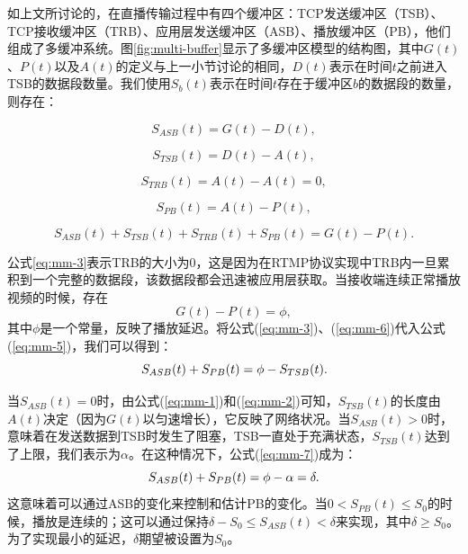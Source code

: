如上文所讨论的，在直播传输过程中有四个缓冲区：TCP发送缓冲区（TSB）、TCP接收缓冲区（TRB）、应用层发送缓冲区（ASB）、播放缓冲区（PB），他们组成了多缓冲系统。图\ref{fig:multi-buffer}显示了多缓冲区模型的结构图，其中$G(t)$、$P(t)$以及$A(t)$的定义与上一小节讨论的相同，$D(t)$表示在时间$t$之前进入TSB的数据段数量。我们使用$S_b(t)$表示在时间$t$存在于缓冲区$b$的数据段的数量，则存在：

\begin{equation}
\label{eq:mm-1}
S_{ASB}(t)=G(t)-D(t),
\end{equation}

\begin{equation}
\label{eq:mm-2}
S_{TSB}(t)=D(t)-A(t),
\end{equation}

\begin{equation}
\label{eq:mm-3}
S_{TRB}(t)=A(t)-A(t)=0,
\end{equation}

\begin{equation}
\label{eq:mm-4}
S_{PB}(t) =A(t)-P(t),
\end{equation}

\begin{equation}
\label{eq:mm-5}
S_{ASB}(t)+S_{TSB}(t)+S_{TRB}(t)+S_{PB}(t)=G(t)-P(t).
\end{equation}
\vspace{10pt}

公式\ref{eq:mm-3}表示TRB的大小为0，这是因为在RTMP协议实现中TRB内一旦累积到一个完整的数据段，该数据段都会迅速被应用层获取。当接收端连续正常播放视频的时候，存在
\begin{equation}
\label{eq:mm-6}
G(t)-P(t)=\phi,
\end{equation}
其中$\phi$是一个常量，反映了播放延迟。将公式(\ref{eq:mm-3})、(\ref{eq:mm-6})代入公式(\ref{eq:mm-5})，我们可以得到：
\vspace{10pt}
\begin{equation}
\vspace{10pt}
\label{eq:mm-7}
S_{ASB}(t)+S_{PB}(t)=\phi-S_{TSB}(t).
\end{equation}

当$S_{ASB}(t)=0$时，由公式(\ref{eq:mm-1})和(\ref{eq:mm-2})可知，$S_{TSB}(t)$的长度由$A(t)$决定（因为$G(t)$以匀速增长），它反映了网络状况。当$S_{ASB}(t)>0$时，意味着在发送数据到TSB时发生了阻塞，TSB一直处于充满状态，$S_{TSB}(t)$达到了上限，我们表示为$\alpha$。在这种情况下，公式(\ref{eq:mm-7})成为：
\vspace{10pt}
\begin{equation}
\vspace{10pt}
\label{eq:mm-8}
S_{ASB}(t)+S_{PB}(t)=\phi-\alpha=\delta.
\end{equation}
这意味着可以通过ASB的变化来控制和估计PB的变化。当$0 < S_{PB}(t) \le S_0$的时候，播放是连续的；这可以通过保持$\delta - S_0 \le S_{ASB}(t) < \delta$来实现，其中$\delta \ge S_0$。为了实现最小的延迟，$\delta$期望被设置为$S_0$。

